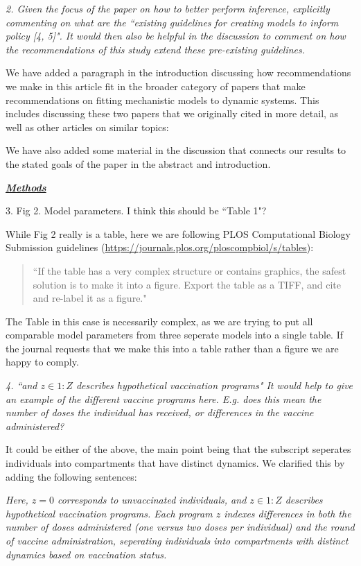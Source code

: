 \documentclass[11pt]{article}
\newcommand\seq[2]{{#1}\!:\!{#2}}
\newcommand\vaccClass{Z}
\newcommand\vaccCounter{z}
\newcommand\report[1]{{\color{mygreen} \vspace{1mm}\hspace{0.25in}\parbox{6in}{\em #1}}}
\newcommand\article[1]{{\color{blue} \vspace{1mm}\hspace{0.25in}\parbox{6in}{\em #1}}}
\begin{document}
\report{2.
  Given the focus of the paper on how to better perform inference, explicitly commenting on what are the ``existing guidelines for creating models to inform policy [4, 5]". It would then also be helpful in the discussion to comment on how the recommendations of this study extend these pre-existing guidelines.
}

We have added a paragraph in the introduction discussing how recommendations we make in this article fit in the broader category of papers that make recommendations on fitting mechanistic models to dynamic systems. This includes discussing these two papers that we originally cited in more detail, as well as other articles on similar topics:

\article{\editModelingGuidance}


We have also added some material in the discussion that connects our results to the stated goals of the paper in the abstract and introduction.

\report{
  \textbf{\underline{Methods}}

3.  Fig 2. Model parameters. I think this should be ``Table 1"?
}

While Fig 2 really is a table, here we are following PLOS Computational Biology Submission guidelines (\url{https://journals.plos.org/ploscompbiol/s/tables}):
\begin{quote}
``If the table has a very complex structure or contains graphics, the safest solution is to make it into a figure. Export the table as a TIFF, and cite and re-label it as a figure."
\end{quote}
The Table in this case is necessarily complex, as we are trying to put all comparable model parameters from three seperate models into a single table.
If the journal requests that we make this into a table rather than a figure we are happy to comply.

\report{4.
    ``and $z \in 1:Z$ describes hypothetical vaccination programs" It would help to give an example of the different vaccine programs here. E.g. does this mean the number of doses the individual has received, or differences in the vaccine administered?
}

It could be either of the above, the main point being that the subscript seperates individuals into compartments that have distinct dynamics. We clarified this by adding the following sentences:

\article{Here, $\vaccCounter=0$ corresponds to unvaccinated individuals, and $\vaccCounter \in \seq{1}{\vaccClass}$ describes hypothetical vaccination programs. Each program $\vaccCounter$ indexes differences in both the number of doses administered (one versus two doses per individual) and the round of vaccine administration, seperating individuals into compartments with distinct dynamics based on vaccination status.}
\end{document}
